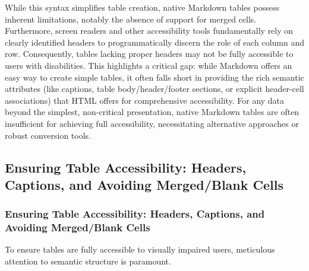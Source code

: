 While this syntax simplifies table creation, native Markdown tables possess inherent limitations, notably the absence of support for merged cells. \cite{DocsToMarkdown} Furthermore, screen readers and other accessibility tools fundamentally rely on clearly identified headers to programmatically discern the role of each column and row. \cite{DocsToMarkdown} Consequently, tables lacking proper headers may not be fully accessible to users with disabilities. \cite{DocsToMarkdown} This highlights a critical gap: while Markdown offers an easy way to create simple tables, it often falls short in providing the rich semantic attributes (like captions, table body/header/footer sections, or explicit header-cell associations) that HTML offers for comprehensive accessibility. For any data beyond the simplest, non-critical presentation, native Markdown tables are often insufficient for achieving full accessibility, necessitating alternative approaches or robust conversion tools.

\subsection{Ensuring Table Accessibility: Headers, Captions, and Avoiding Merged/Blank Cells}
\subsubsection{Ensuring Table Accessibility: Headers, Captions, and Avoiding Merged/Blank Cells}

To ensure tables are fully accessible to visually impaired users, meticulous attention to semantic structure is paramount.

